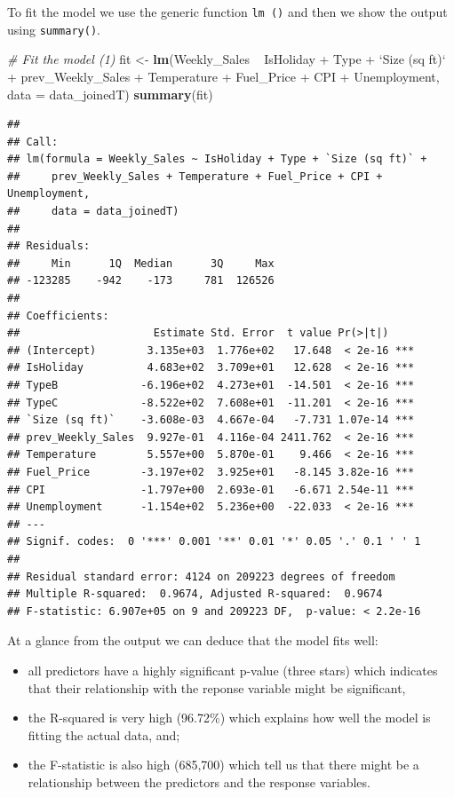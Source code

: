 \documentclass[11pt,]{article}
\newenvironment{Shaded}{\begin{snugshade}}{\end{snugshade}}
\newcommand{\KeywordTok}[1]{\textcolor[rgb]{0.13,0.29,0.53}{\textbf{{#1}}}}
\newcommand{\DataTypeTok}[1]{\textcolor[rgb]{0.13,0.29,0.53}{{#1}}}
\newcommand{\StringTok}[1]{\textcolor[rgb]{0.31,0.60,0.02}{{#1}}}
\newcommand{\CommentTok}[1]{\textcolor[rgb]{0.56,0.35,0.01}{\textit{{#1}}}}
\newcommand{\NormalTok}[1]{{#1}}
\begin{document}
To fit the model we use the generic function \texttt{lm\ ()} and then we
show the output using \texttt{summary()}.

\begin{Shaded}
\begin{Highlighting}[]
\CommentTok{# Fit the model (1)}
\NormalTok{fit <-}\StringTok{ }\KeywordTok{lm}\NormalTok{(Weekly_Sales ~}\StringTok{ }\NormalTok{IsHoliday +}\StringTok{ }\NormalTok{Type +}\StringTok{ `}\DataTypeTok{Size (sq ft)}\StringTok{`} \NormalTok{+}\StringTok{ }
\StringTok{    }\NormalTok{prev_Weekly_Sales +}\StringTok{ }\NormalTok{Temperature +}\StringTok{ }\NormalTok{Fuel_Price +}\StringTok{ }\NormalTok{CPI +}\StringTok{ }\NormalTok{Unemployment, }
    \DataTypeTok{data =} \NormalTok{data_joinedT)}
\KeywordTok{summary}\NormalTok{(fit)}
\end{Highlighting}
\end{Shaded}

\begin{verbatim}
## 
## Call:
## lm(formula = Weekly_Sales ~ IsHoliday + Type + `Size (sq ft)` + 
##     prev_Weekly_Sales + Temperature + Fuel_Price + CPI + Unemployment, 
##     data = data_joinedT)
## 
## Residuals:
##     Min      1Q  Median      3Q     Max 
## -123285    -942    -173     781  126526 
## 
## Coefficients:
##                     Estimate Std. Error  t value Pr(>|t|)    
## (Intercept)        3.135e+03  1.776e+02   17.648  < 2e-16 ***
## IsHoliday          4.683e+02  3.709e+01   12.628  < 2e-16 ***
## TypeB             -6.196e+02  4.273e+01  -14.501  < 2e-16 ***
## TypeC             -8.522e+02  7.608e+01  -11.201  < 2e-16 ***
## `Size (sq ft)`    -3.608e-03  4.667e-04   -7.731 1.07e-14 ***
## prev_Weekly_Sales  9.927e-01  4.116e-04 2411.762  < 2e-16 ***
## Temperature        5.557e+00  5.870e-01    9.466  < 2e-16 ***
## Fuel_Price        -3.197e+02  3.925e+01   -8.145 3.82e-16 ***
## CPI               -1.797e+00  2.693e-01   -6.671 2.54e-11 ***
## Unemployment      -1.154e+02  5.236e+00  -22.033  < 2e-16 ***
## ---
## Signif. codes:  0 '***' 0.001 '**' 0.01 '*' 0.05 '.' 0.1 ' ' 1
## 
## Residual standard error: 4124 on 209223 degrees of freedom
## Multiple R-squared:  0.9674, Adjusted R-squared:  0.9674 
## F-statistic: 6.907e+05 on 9 and 209223 DF,  p-value: < 2.2e-16
\end{verbatim}

At a glance from the output we can deduce that the model fits well:

\begin{itemize}
\item
  all predictors have a highly significant p-value (three stars) which
  indicates that their relationship with the reponse variable might be
  significant,
\item
  the R-squared is very high (96.72\%) which explains how well the model
  is fitting the actual data, and;
\item
  the F-statistic is also high (685,700) which tell us that there might
  be a relationship between the predictors and the response variables.
\end{itemize}
\end{document}
